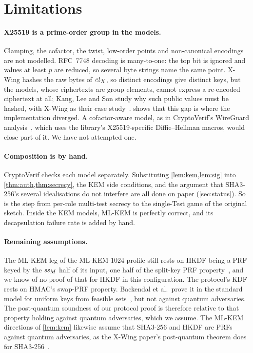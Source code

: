 \section{Limitations}\label{sec:limits}

\paragraph{X25519 is a prime-order group in the models.} Clamping, the
cofactor, the twist, low-order points and non-canonical encodings are not
modelled. RFC~7748 decoding is many-to-one: the top bit is ignored and
values at least $p$ are reduced, so several byte strings name the same
point. X-Wing hashes the raw bytes of $\mathit{ct}_X$, so distinct encodings give
distinct keys, but the models, whose ciphertexts are group elements, cannot
express a re-encoded ciphertext at all; Kang, Lee and Son study why such
public values must be hashed, with X-Wing as their case
study~\cite{KLS26}.  shows that this gap is where the
implementation diverged. A cofactor-aware model, as in CryptoVerif's
WireGuard analysis~\cite{LBB19}, which uses the library's X25519-specific
Diffie--Hellman macros, would close part of it. We have not attempted one.

\paragraph{Composition is by hand.} CryptoVerif checks each model
separately. Substituting \cref{lem:kem,lem:sig} into
\cref{thm:auth,thm:secrecy}, the KEM side conditions, and the argument that
SHA3-256's several idealisations do not interfere are all done on paper
(\cref{sec:status}). So is the step from per-role multi-test secrecy to the
single-Test game of the original sketch. Inside the KEM models, ML-KEM is
perfectly correct, and its decapsulation failure rate is added by hand.

\paragraph{Remaining assumptions.} The ML-KEM leg of the ML-KEM-1024 profile
still rests on HKDF being a PRF keyed by the $\mathit{ss}_M$ half of its input, one
half of the split-key PRF property~\cite{GHP18,MSS26,ABK25}, and we know of
no proof of that for HKDF in this configuration. The protocol's KDF rests on
HMAC's swap-PRF property. Backendal et al.\ prove it in the standard model
for uniform keys from feasible sets~\cite{BBGS23}, but not against quantum
adversaries. The post-quantum soundness of our protocol proof is
therefore relative to that property holding against quantum adversaries,
which we assume. The ML-KEM directions of \cref{lem:kem} likewise assume
that SHA3-256 and HKDF are PRFs against quantum adversaries, as the X-Wing
paper's post-quantum theorem does for SHA3-256~\cite{XWing}.

